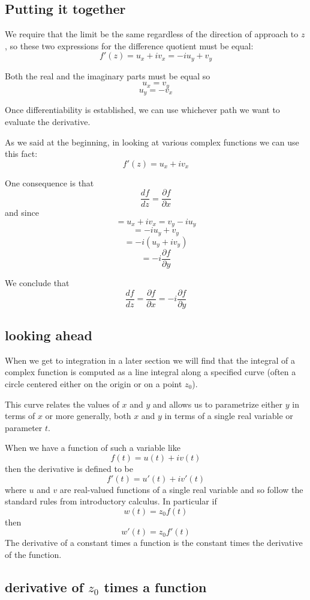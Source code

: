 \documentclass[11pt, oneside]{article}
\begin{document}
\subsection*{Putting it together}
We require that the limit be the same regardless of the direction of approach to $z$, so these two expressions for the difference quotient must be equal:
\[ f'(z) = u_x + i v_x = - i u_y + v_y \]

Both the real and the imaginary parts must be equal so
\[ u_x  = v_y \]
\[ u_y = - v_x \]

Once differentiability is established, we can use whichever path we want to evaluate the derivative.

As we said at the beginning, in looking at various complex functions we can use this fact:
\[ f'(z) = u_x + i v_x \]

One consequence is that
\[ \frac{df}{dz} = \frac{\partial f}{\partial x} \]
and since
\[ = u_x + i v_x = v_y - i u_y \]
\[ = - i u_y + v_y \]
\[ = -i (u_y + i v_y) \]
\[ = -i \frac{\partial f}{\partial y} \]

We conclude that 
\[ \frac{df}{dz} = \frac{\partial f}{\partial x} = -i \frac{\partial f}{\partial y} \]

\subsection*{looking ahead}
When we get to integration in a later section we will find that the integral of a complex function is computed as a line integral along a specified curve (often a circle centered either on the origin or on a point $z_0$).

This curve relates the values of $x$ and $y$ and allows us to parametrize either $y$ in terms of $x$ or more generally, both $x$ and $y$ in terms of a single real variable or parameter $t$.

When we have a function of such a variable like
\[ f(t) = u(t) + i v(t) \]
then the derivative is defined to be
\[ f'(t) = u'(t) + i v'(t) \]
where $u$ and $v$ are real-valued functions of a single real variable and so follow the standard rules from introductory calculus.  In particular if
\[ w(t) = z_0 f(t) \]
then
\[ w'(t) = z_0 f'(t) \]
The derivative of a constant times a function is the constant times the derivative of the function.

\subsection*{derivative of $z_0$ times a function}
\end{document}
